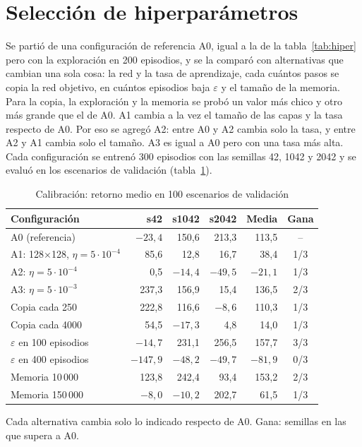 \documentclass[conference]{IEEEtran}
\begin{document}
\section{Selección de hiperparámetros}
\label{sec:calibracion}
Se partió de una configuración de referencia A0, igual a la de la tabla~\ref{tab:hiper} pero con la exploración en 200 episodios, y se la comparó con alternativas que cambian una sola cosa: la red y la tasa de aprendizaje, cada cuántos pasos se copia la red objetivo, en cuántos episodios baja $\varepsilon$ y el tamaño de la memoria. Para la copia, la exploración y la memoria se probó un valor más chico y otro más grande que el de A0. A1 cambia a la vez el tamaño de las capas y la tasa respecto de A0. Por eso se agregó A2: entre A0 y A2 cambia solo la tasa, y entre A2 y A1 cambia solo el tamaño. A3 es igual a A0 pero con una tasa más alta. Cada configuración se entrenó 300 episodios con las semillas 42, 1042 y 2042 y se evaluó en los escenarios de validación (tabla~\ref{tab:calibracion}).

\begin{table}[t]
\caption{Calibración: retorno medio en 100 escenarios de validación}
\label{tab:calibracion}
\centering
\begin{tabular}{@{}lrrrrc@{}}
\toprule
Configuración & s42 & s1042 & s2042 & Media & Gana \\
\midrule
A0 (referencia) & $-23{,}4$ & 150,6 & 213,3 & 113,5 & -- \\
A1: 128$\times$128, $\eta=5\cdot10^{-4}$ & 85,6 & 12,8 & 16,7 & 38,4 & 1/3 \\
A2: $\eta=5\cdot10^{-4}$ & 0,5 & $-14{,}4$ & $-49{,}5$ & $-21{,}1$ & 1/3 \\
A3: $\eta=5\cdot10^{-3}$ & 237,3 & 156,9 & 15,4 & 136,5 & 2/3 \\
Copia cada 250 & 222,8 & 116,6 & $-8{,}6$ & 110,3 & 1/3 \\
Copia cada 4000 & 54,5 & $-17{,}3$ & 4,8 & 14,0 & 1/3 \\
$\varepsilon$ en 100 episodios & $-14{,}7$ & 231,1 & 256,5 & 157,7 & 3/3 \\
$\varepsilon$ en 400 episodios & $-147{,}9$ & $-48{,}2$ & $-49{,}7$ & $-81{,}9$ & 0/3 \\
Memoria 10\,000 & 123,8 & 242,4 & 93,4 & 153,2 & 2/3 \\
Memoria 150\,000 & $-8{,}0$ & $-10{,}2$ & 202,7 & 61,5 & 1/3 \\
\bottomrule
\end{tabular}
\smallskip
\parbox{\columnwidth}{\footnotesize Cada alternativa cambia solo lo indicado respecto de A0. Gana: semillas en las que supera a A0.}
\end{table}
\end{document}
